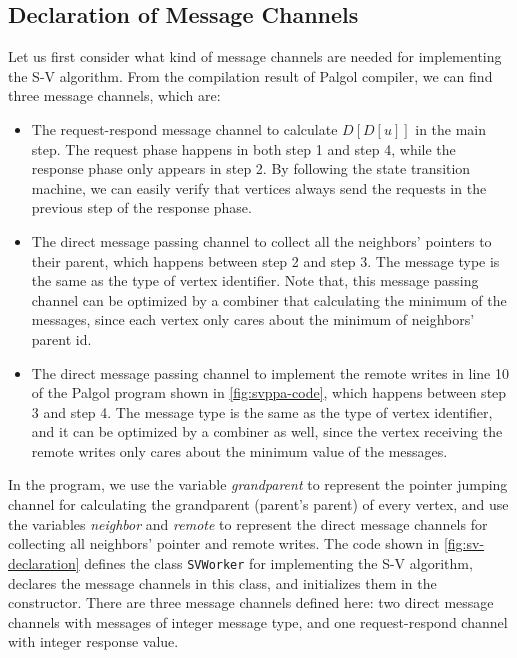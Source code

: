 \documentclass{sokendai_thesis} %
\begin{document}
\subsection{Declaration of Message Channels}

Let us first consider what kind of message channels are needed for implementing the S-V algorithm.
From the compilation result of Palgol compiler, we can find three message channels, which are:
\begin{itemize}
\item
 The request-respond message channel to calculate $D[D[u]]$ in the main step.
 The request phase happens in both step 1 and step 4, while the response phase only appears in step 2.
 By following the state transition machine, we can easily verify that vertices always send the requests in the previous step of the response phase.
\item
 The direct message passing channel to collect all the neighbors' pointers to their parent, which happens between step 2 and step 3.
 The message type is the same as the type of vertex identifier.
 Note that, this message passing channel can be optimized by a combiner that calculating the minimum of the messages, since each vertex only cares about the minimum of neighbors' parent id.
\item
 The direct message passing channel to implement the remote writes in line 10 of the Palgol program shown in \autoref{fig:svppa-code}, which happens between step 3 and step 4.
 The message type is the same as the type of vertex identifier, and it can be optimized by a combiner as well, since the vertex receiving the remote writes only cares about the minimum value of the messages.
\end{itemize}

In the program, we use the variable \textit{grandparent} to represent the pointer jumping channel for calculating the grandparent (parent's parent) of every vertex, and use the variables \textit{neighbor} and \textit{remote} to represent the direct message channels for collecting all neighbors' pointer and remote writes.
The code shown in \autoref{fig:sv-declaration} defines the class \texttt{SVWorker} for implementing the S-V algorithm, declares the message channels in this class, and initializes them in the constructor.
There are three message channels defined here: two direct message channels with messages of integer message type, and one request-respond channel with integer response value.
\end{document}
